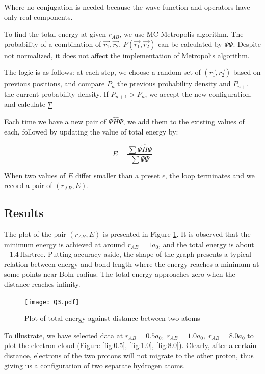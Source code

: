 \documentclass{article}
\begin{document}
Where no conjugation is needed because the wave function and operators have only real components.

To find the total energy at given $r_{AB}$, we use MC Metropolis
algorithm. The probability of a combination of $\vec{r_1},
   \vec{r_2}$, $P(\vec{r_1}, \vec{r_2})$ can be calculated by $\Psi
   \Psi$. Despite not normalized, it does not affect the implementation of Metropolis algorithm.

The logic is as follows: at each step, we choose a random set of
$(\vec{r_1}, \vec{r_2})$ based on previous positions, and compare
$P_n$ the previous probability density and $P_{n+1}$ the current
probability density. If $P_{n+1} > P_n$, we accept the new
configuration, and calculate ∑

Each time we have a new pair of $\Psi \hat{H} \Psi$, we add them to
the existing values of each, followed by updating the value of total energy by:

\begin{equation}
  E =\frac{ \sum\Psi \hat{H} \Psi}{\sum\Psi \Psi }
\end{equation}

When two values of $E$ differ smaller than a preset $\epsilon$, the loop terminates and we record a pair of $(r_{AB}, E)$.
\subsection{Results}
\label{sec-3-2}

The plot of the pair $(r_{AB}, E)$ is presented in Figure
\ref{fig:rE}. It is observed that the minimum energy is achieved at
around $r_{AB} = 1a_0$, and the total energy is about $-1.4
   \,\text{Hartree}$. Putting accuracy aside, the shape of the graph
presents a typical relation between energy and bond length where
the energy reaches a minimum at some points near Bohr radius. The
total energy approaches zero when the distance reaches infinity.


\begin{figure}[H]
  \centering
  \texttt{[image: Q3.pdf]}
  \caption{Plot of total energy against distance between two atoms}
  \label{fig:rE}
\end{figure}

To illustrate, we have selected data at $r_{AB} = 0.5 a_0, \;
   r_{AB} = 1.0 a_0, \; r_{AB} = 8.0 a_0$ to plot the electron
cloud (Figure \ref{fig:0.5}, \ref{fig:1.0}, \ref{fig:8.0}). Clearly,
after a certain distance, electrons of the two protons will not
migrate to the other proton, thus giving us a configuration of two
separate hydrogen atoms.
\end{document}
